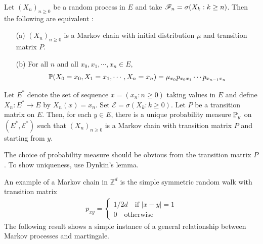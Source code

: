\documentclass[12pt,a4paper]{report}
\newenvironment{proof}
{\begin{changemargin}{1cm}{0.5cm} 
	}%
	{\end{changemargin}
}
\begin{document}
 Let $(X_n)_{n\geq 0}$ be a random process in $E$ and take $\mathscr{F}_n = \sigma (X_k : k\geq n)$. Then the following are equivalent :
\begin{itemize}
\item[(a)] $(X_n)_{n\geq 0}$ is a Markov chain with initial distribution $\mu$ and transition matrix $P$.
\item[(b)] For all $n$ and all $x_0,x_1,\cdots,x_n\in E$,
\begin{align*}
\mathbb{P}(X_0 = x_0, X_1=x_1,\cdots,X_n=x_n) = \mu_{x_0} p_{x_0 x_1} \cdots p_{x_{n-1}x_n}
\end{align*}
\end{itemize}
\s

 Let $E^*$ denote the set of sequence $x=(x_n : n\geq 0)$ taking values in $E$ and define $X_n : E^* \rightarrow E$ by $X_n(x) = x_n$. Set $\mathscr{E} = \sigma (X_k : k\geq 0)$. Let $P$ be a transition matrix on $E$. Then, for each $y\in E$, there is a unique probability measure $\mathbb{P}_y$ on $(E^*,\mathscr{E}^*)$ such that $(X_n)_{n\geq 0}$ is a Markov chain with transition matrix $P$ and starting from $y$.
\begin{proof}
\pf The choice of probability measure should be obvious from the transition matrix $P$. To show uniqueness, use Dynkin's lemma.
\end{proof}

\s

An example of a Markov chain in $\mathbb{Z}^d$ is the simple symmetric random walk with transition matrix
\begin{align*}
p_{xy} = \begin{cases}
1/2d \quad \text{if } |x-y| =1 \\
0 \quad \text{otherwise}
\end{cases}
\end{align*}
The following result shows a simple instance of a general relationship between Markov processes and martingale.
\s
\end{document}

